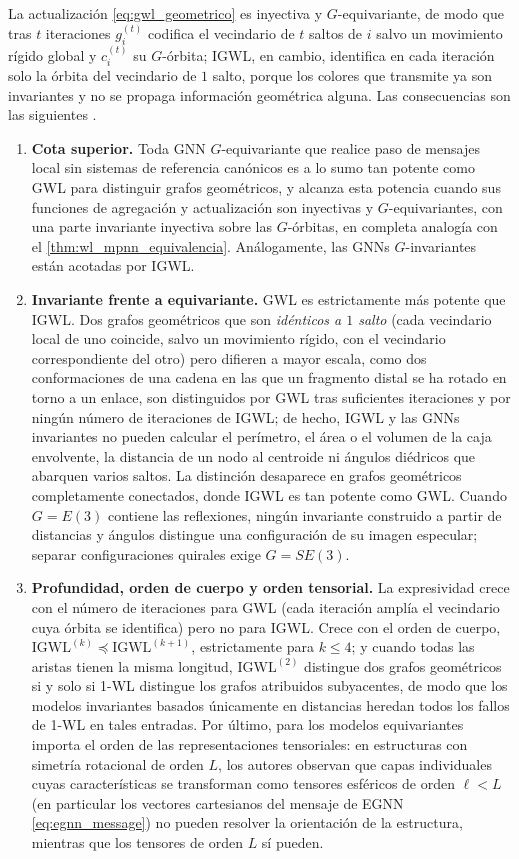 La actualización \eqref{eq:gwl_geometrico} es inyectiva y $G$-equivariante, de modo que tras $t$ iteraciones $g_i^{(t)}$ codifica el vecindario de $t$ saltos de $i$ salvo un movimiento rígido global y $c_i^{(t)}$ su $G$-órbita; IGWL, en cambio, identifica en cada iteración solo la órbita del vecindario de $1$ salto, porque los colores que transmite ya son invariantes y no se propaga información geométrica alguna. Las consecuencias son las siguientes \citep{joshi2023expressive}.
\begin{enumerate}
	\item \textbf{Cota superior.} Toda \gls{GNN} $G$-equivariante que realice paso de mensajes local sin sistemas de referencia canónicos es a lo sumo tan potente como GWL para distinguir grafos geométricos, y alcanza esta potencia cuando sus funciones de agregación y actualización son inyectivas y $G$-equivariantes, con una parte invariante inyectiva sobre las $G$-órbitas, en completa analogía con el \autoref{thm:wl_mpnn_equivalencia}. Análogamente, las \glspl{GNN} $G$-invariantes están acotadas por IGWL.
	\item \textbf{Invariante frente a equivariante.} GWL es estrictamente más potente que IGWL. Dos grafos geométricos que son \textit{idénticos a $1$ salto} (cada vecindario local de uno coincide, salvo un movimiento rígido, con el vecindario correspondiente del otro) pero difieren a mayor escala, como dos conformaciones de una cadena en las que un fragmento distal se ha rotado en torno a un enlace, son distinguidos por GWL tras suficientes iteraciones y por ningún número de iteraciones de IGWL; de hecho, IGWL y las \glspl{GNN} invariantes no pueden calcular el perímetro, el área o el volumen de la caja envolvente, la distancia de un nodo al centroide ni ángulos diédricos que abarquen varios saltos. La distinción desaparece en grafos geométricos completamente conectados, donde IGWL es tan potente como GWL. Cuando $G = E(3)$ contiene las reflexiones, ningún invariante construido a partir de distancias y ángulos distingue una configuración de su imagen especular; separar configuraciones quirales exige $G = SE(3)$.
	\item \textbf{Profundidad, orden de cuerpo y orden tensorial.} La expresividad crece con el número de iteraciones para GWL (cada iteración amplía el vecindario cuya órbita se identifica) pero no para IGWL. Crece con el orden de cuerpo, $\mathrm{IGWL}^{(k)} \preceq \mathrm{IGWL}^{(k+1)}$, estrictamente para $k \leq 4$; y cuando todas las aristas tienen la misma longitud, $\mathrm{IGWL}^{(2)}$ distingue dos grafos geométricos si y solo si 1-WL distingue los grafos atribuidos subyacentes, de modo que los modelos invariantes basados únicamente en distancias heredan todos los fallos de 1-WL en tales entradas. Por último, para los modelos equivariantes importa el orden de las representaciones tensoriales: en estructuras con simetría rotacional de orden $L$, los autores observan que capas individuales cuyas características se transforman como tensores esféricos de orden $\ell < L$ (en particular los vectores cartesianos del mensaje de EGNN \eqref{eq:egnn_message}) no pueden resolver la orientación de la estructura, mientras que los tensores de orden $L$ sí pueden.
\end{enumerate}

